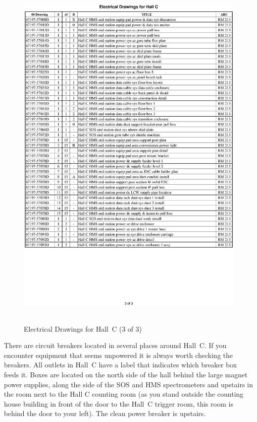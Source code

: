 \clearpage
\begin{figure}
\begin{center}
\includegraphics[height=7in]{ele3p.ps}
\caption{Electrical Drawings for Hall~C (3 of 3)}
\label{fig:elect_dwgs3}
\end{center}
\end{figure}
\clearpage


There are circuit breakers located in several places around Hall~C.
If you encounter equipment that seems unpowered it is always worth checking the
breakers. All outlets in Hall~C  have a label that indicates which
breaker box feeds it. Boxes are located on the north side of the hall behind
the large magnet power supplies, along the side of the SOS and HMS spectrometers
and upstairs in the room next to the Hall C counting room (as you stand outside the
counting house building in front of the door to the Hall~C trigger
room, this room is behind the door to your left). The clean power
breaker is upstairs.

